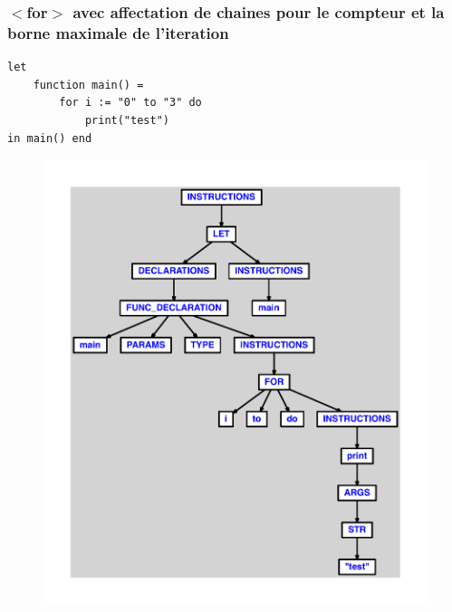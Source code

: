 \documentclass{article}
\begin{document}
\subsubsection{$ < $for$ > $ avec affectation de chaines pour le compteur et la borne maximale de l'iteration}
\begin{lstlisting}
let
	function main() =
		for i := "0" to "3" do
			print("test")
in main() end
\end{lstlisting}
\newpage
\begin{figure}[H]
\centering
\includegraphics[max width=\textwidth]{ast/ast_197.pdf}
\end{figure}
\newpage
\end{document}

